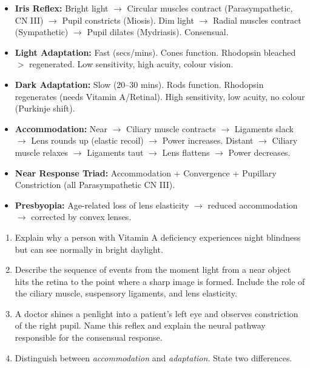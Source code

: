 \documentclass[11pt]{article}
\newcounter{popsec}
\newcounter{popsub}
\newcommand{\courssub}[1]{%
  \stepcounter{popsub}%
  \par\vspace{9pt}\noindent{\popxbold\fontsize{11.5}{13}\selectfont\color{popink}{\color{poporange}\thepopsec.\thepopsub}\hspace{6pt}#1}\par\nopagebreak\vspace{4pt}
}
\begin{document}
\courssub{Summary and Key Points}

\begin{aretenir}
\begin{itemize}
    \item \textbf{Iris Reflex:} Bright light $\to$ Circular muscles contract (Parasympathetic, CN III) $\to$ Pupil constricts (Miosis). Dim light $\to$ Radial muscles contract (Sympathetic) $\to$ Pupil dilates (Mydriasis). Consensual.
    \item \textbf{Light Adaptation:} Fast (secs/mins). Cones function. Rhodopsin bleached $>$ regenerated. Low sensitivity, high acuity, colour vision.
    \item \textbf{Dark Adaptation:} Slow (20--30 mins). Rods function. Rhodopsin regenerates (needs Vitamin A/Retinal). High sensitivity, low acuity, no colour (Purkinje shift).
    \item \textbf{Accommodation:} Near $\to$ Ciliary muscle contracts $\to$ Ligaments slack $\to$ Lens rounds up (elastic recoil) $\to$ Power increases. Distant $\to$ Ciliary muscle relaxes $\to$ Ligaments taut $\to$ Lens flattens $\to$ Power decreases.
    \item \textbf{Near Response Triad:} Accommodation + Convergence + Pupillary Constriction (all Parasympathetic CN III).
    \item \textbf{Presbyopia:} Age-related loss of lens elasticity $\to$ reduced accommodation $\to$ corrected by convex lenses.
\end{itemize}
\end{aretenir}

\begin{exercice}
\begin{enumerate}
    \item Explain why a person with Vitamin A deficiency experiences night blindness but can see normally in bright daylight.
    \item Describe the sequence of events from the moment light from a near object hits the retina to the point where a sharp image is formed. Include the role of the ciliary muscle, suspensory ligaments, and lens elasticity.
    \item A doctor shines a penlight into a patient's left eye and observes constriction of the right pupil. Name this reflex and explain the neural pathway responsible for the consensual response.
    \item Distinguish between \emph{accommodation} and \emph{adaptation}. State two differences.
\end{enumerate}
\end{exercice}
\end{document}
